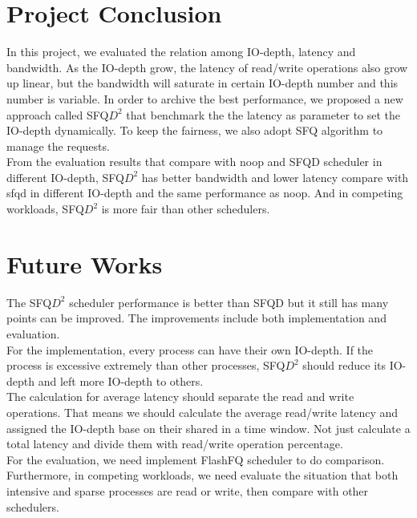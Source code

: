 \section{Project Conclusion}

In this project, we evaluated the relation among IO-depth, latency and bandwidth.
As the IO-depth grow, the latency of read/write operations also grow up linear, 
but the bandwidth will saturate in certain IO-depth number and this number is variable.
In order to archive the best performance, we proposed a new approach called SFQ$D^2$ that benchmark the
the latency as parameter to set the IO-depth dynamically. To keep the fairness, we also
adopt SFQ algorithm to manage the requests. \\
From the evaluation results that compare with noop and SFQD scheduler in different IO-depth, SFQ$D^2$
has better bandwidth and lower latency compare with sfqd in different IO-depth and the same performance
as noop. And in competing workloads, SFQ$D^2$ is more fair than other schedulers.\\

\section{Future Works}

The SFQ$D^2$ scheduler performance is better than SFQD but it still has many points can be improved.
The improvements include both implementation and evaluation.\\
For the implementation, every process can have their own IO-depth. If the process is excessive extremely than
other processes, SFQ$D^2$ should reduce its IO-depth and left more IO-depth to others.\\
The calculation for average latency should separate the read and write operations. That means we should
calculate the average read/write latency and assigned the IO-depth base on their shared in a time window.
Not just calculate a total latency and divide them with read/write operation percentage.\\
For the evaluation, we need implement FlashFQ scheduler to do comparison. Furthermore, in competing workloads,
we need evaluate the situation that both intensive and sparse processes are read or write, then compare
with other schedulers.\\



